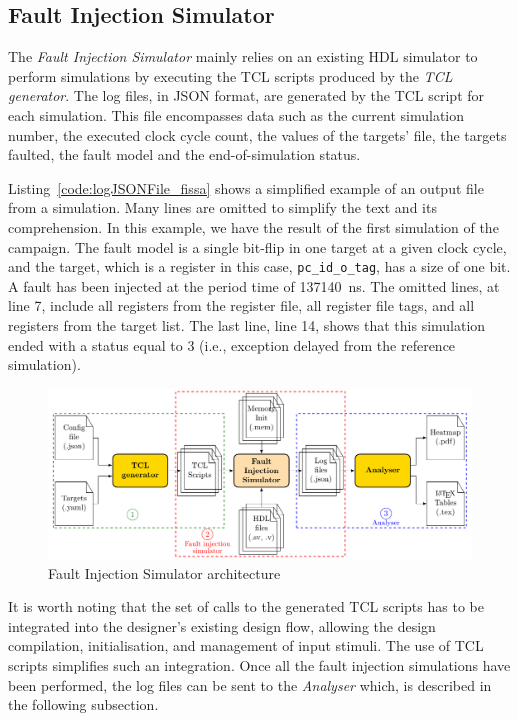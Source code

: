\subsection{Fault Injection Simulator}
\label{subsec:FIS}

The \textit{Fault Injection Simulator} mainly relies on an existing HDL simulator to perform simulations by executing the TCL scripts produced by the \textit{TCL generator}. The log files, in JSON format, are generated by the TCL script for each simulation.
This file encompasses data such as the current simulation number, the executed clock cycle count, the values of the targets' file, the targets faulted, the fault model and the end-of-simulation status.

Listing~\ref{code:logJSONFile_fissa} shows a simplified example of an output file from a simulation. Many lines are omitted to simplify the text and its comprehension. In this example, we have the result of the first simulation of the campaign. The fault model is a single bit-flip in one target at a given clock cycle, and the target, which is a register in this case, \texttt{pc\_id\_o\_tag}, has a size of one bit. A fault has been injected at the period time of \SI{137140}{\nano\second}. The omitted lines, at line 7, include all registers from the register file, all register file tags, and all registers from the target list. The last line, line 14, shows that this simulation ended with a status equal to 3 (i.e., exception delayed from the reference simulation).

\begin{figure}[ht]
    \centering
    \includegraphics[width=.5\textwidth, page=4]{c4_fissa/img/fissa/archi_fissa.pdf}
    \caption{Fault Injection Simulator architecture}
    \label{fig:archi_fis}
\end{figure}

It is worth noting that the set of calls to the generated TCL scripts has to be integrated into the designer's existing design flow, allowing the design compilation, initialisation, and management of input stimuli. The use of TCL scripts simplifies such an integration. 
Once all the fault injection simulations have been performed, the log files can be sent to the \textit{Analyser} which, is described in the following subsection.

